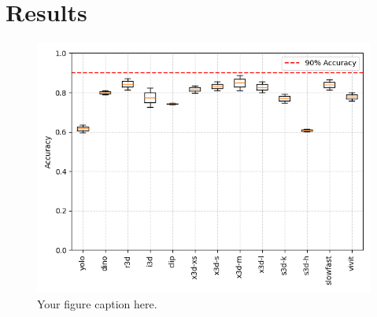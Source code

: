 \section{Results}

\begin{figure}[H]
    \centering
    \includegraphics[width=1\linewidth]{../../assets/figures/mlp.training-results.boxplot.png}
    \caption{Your figure caption here.}
    \label{figure:models-performances}
\end{figure}




